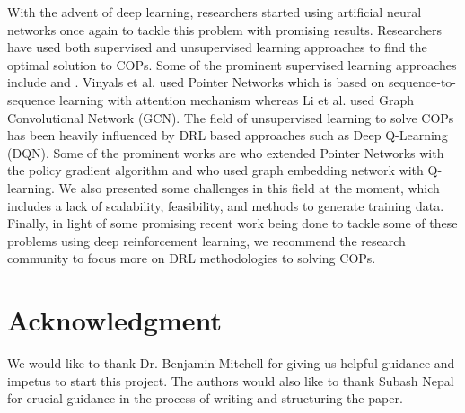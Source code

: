 \documentclass{article}
\begin{document}
With the advent of deep learning, researchers started using artificial neural networks once again to tackle this problem with promising results. Researchers have used both supervised and unsupervised learning approaches to find the optimal solution to COPs. Some of the prominent supervised learning approaches include \cite{vinyals2015pointer} and \cite{khalil2017learning}. Vinyals et al. used Pointer Networks which is based on sequence-to-sequence learning with attention mechanism whereas Li et al. used Graph Convolutional Network (GCN). The field of unsupervised learning to solve COPs has been heavily influenced by DRL based approaches such as Deep Q-Learning (DQN). Some of the prominent works are \cite{bello2016neural} who extended Pointer Networks with the policy gradient algorithm and \cite{khalil2017learning} who used graph embedding network with Q-learning. We also presented some challenges in this field at the moment, which includes a lack of scalability, feasibility, and methods to generate training data. Finally, in light of some promising recent work being done to tackle some of these problems using deep reinforcement learning, we recommend the research community to focus more on DRL methodologies to solving COPs. 

\section*{Acknowledgment}
We would like to thank Dr. Benjamin Mitchell for giving us helpful guidance and impetus to start this project. The authors would also like to thank Subash Nepal for crucial guidance in the process of writing and structuring the paper.


\newpage




\end{document}
